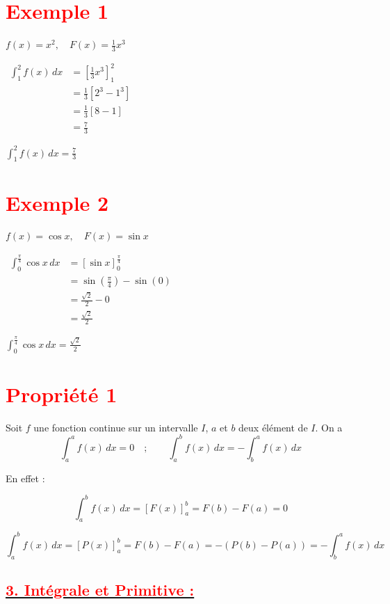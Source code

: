 \documentclass[12pt,a4paper]{article}
\begin{document}
\section*{\textbf{\textcolor{red}{Exemple 1}}}

\(
f(x) = x^2, \quad F(x) = \frac{1}{3} x^3
\)

\(
\begin{aligned}
\int_1^2 f(x) \, dx &= \left[ \frac{1}{3} x^3 \right]_1^2 \\
&= \frac{1}{3} \left[ 2^3 - 1^3 \right] \\
&= \frac{1}{3} \left[ 8 - 1 \right] \\
&= \frac{7}{3}
\end{aligned}
\)

\( \boxed{\int_1^2 f(x) \, dx=\frac{7}{3}} \)

\section*{\textbf{\textcolor{red}{Exemple 2}}}

\(
f(x) = \cos x, \quad F(x) = \sin x
\)

\(
\begin{aligned}
\int_0^{\frac{\pi}{4}} \cos x \, dx &= \left[ \sin x \right]_0^{\frac{\pi}{4}} \\
&= \sin \left( \frac{\pi}{4} \right) - \sin(0) \\
&= \frac{\sqrt{2}}{2} - 0 \\
&= \frac{\sqrt{2}}{2}
\end{aligned}
\)

\( \boxed{\int_0^{\frac{\pi}{4}} \cos x \, dx = \frac{\sqrt{2}}{2}} \)

\section*{\textbf{\textcolor{red}{Propriété 1 }}}
Soit \( f \) une fonction continue sur un intervalle \( I \), \( a \) et \( b \) deux élément de \( I \). On a
\[
\int_a^a f(x) \, dx = 0 \quad;\quad \quad \int_a^b f(x) \, dx = - \int_b^a f(x) \, dx
\]

En effet :

\[
\int_a^b f(x) \, dx = \left[ F(x) \right]_a^b = F(b) - F(a) = 0
\]

\[
\int_a^b f(x) \, dx = \left[ P(x) \right]_a^b = F(b) - F(a) = - \left( P(b) - P(a) \right)=-\int_b^a f(x) \, dx
\]

\subsection*{\underline{\textbf{\textcolor{red}{3. Intégrale et Primitive :}}}}
\end{document}
